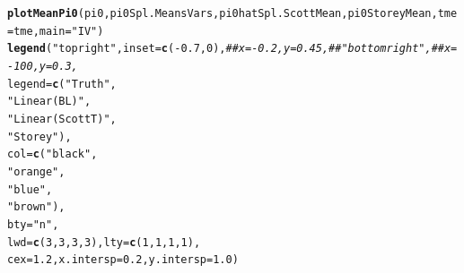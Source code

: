 \documentclass{article}\usepackage[]{graphicx}\usepackage[]{color}
\makeatletter
\newcommand{\hlnum}[1]{\textcolor[rgb]{0.686,0.059,0.569}{#1}}%
\newcommand{\hlstr}[1]{\textcolor[rgb]{0.192,0.494,0.8}{#1}}%
\newcommand{\hlcom}[1]{\textcolor[rgb]{0.678,0.584,0.686}{\textit{#1}}}%
\newcommand{\hlopt}[1]{\textcolor[rgb]{0,0,0}{#1}}%
\newcommand{\hlstd}[1]{\textcolor[rgb]{0.345,0.345,0.345}{#1}}%
\newcommand{\hlkwc}[1]{\textcolor[rgb]{0.333,0.667,0.333}{#1}}%
\newcommand{\hlkwd}[1]{\textcolor[rgb]{0.737,0.353,0.396}{\textbf{#1}}}%
\newenvironment{kframe}{%
 \def\at@end@of@kframe{}%
 \ifinner\ifhmode%
  \def\at@end@of@kframe{\end{minipage}}%
  \begin{minipage}{\columnwidth}%
 \fi\fi%
 \def\FrameCommand##1{\hskip\@totalleftmargin \hskip-\fboxsep
 \colorbox{shadecolor}{##1}\hskip-\fboxsep
     \hskip-\linewidth \hskip-\@totalleftmargin \hskip\columnwidth}%
 \MakeFramed {\advance\hsize-\width
   \@totalleftmargin\z@ \linewidth\hsize
   \@setminipage}}%
 {\par\unskip\endMakeFramed%
 \at@end@of@kframe}
\newenvironment{knitrout}{}{} %
\makeatother
\begin{document}
\begin{knitrout}
\begin{kframe}
\begin{alltt}
\hlkwd{plotMeanPi0}\hlstd{(pi0, pi0Spl.MeansVars, pi0hatSpl.ScottMean, pi0StoreyMean,} \hlkwc{tme}\hlstd{=tme,} \hlkwc{main}\hlstd{=}\hlstr{"IV"}\hlstd{)}
\hlkwd{legend}\hlstd{(}\hlstr{"topright"}\hlstd{,} \hlkwc{inset}\hlstd{=}\hlkwd{c}\hlstd{(}\hlopt{-}\hlnum{0.7}\hlstd{,}\hlnum{0}\hlstd{),}\hlcom{##x=-0.2, y=0.45,##"bottomright", ##x=-100, y=0.3, }
       \hlkwc{legend}\hlstd{=}\hlkwd{c}\hlstd{(}\hlstr{"Truth"}\hlstd{,}
                \hlstr{"Linear (BL)"}\hlstd{,}
                \hlstr{"Linear (Scott T)"}\hlstd{,}
                \hlstr{"Storey"}\hlstd{),}
       \hlkwc{col}\hlstd{=}\hlkwd{c}\hlstd{(}\hlstr{"black"}\hlstd{,}
             \hlstr{"orange"}\hlstd{,}
             \hlstr{"blue"}\hlstd{,}
             \hlstr{"brown"}\hlstd{),}
       \hlkwc{bty}\hlstd{=}\hlstr{"n"}\hlstd{,}
       \hlkwc{lwd}\hlstd{=}\hlkwd{c}\hlstd{(}\hlnum{3}\hlstd{,}\hlnum{3}\hlstd{,}\hlnum{3}\hlstd{,}\hlnum{3}\hlstd{),} \hlkwc{lty}\hlstd{=}\hlkwd{c}\hlstd{(}\hlnum{1}\hlstd{,}\hlnum{1}\hlstd{,}\hlnum{1}\hlstd{,}\hlnum{1}\hlstd{),}
       \hlkwc{cex}\hlstd{=}\hlnum{1.2}\hlstd{,} \hlkwc{x.intersp}\hlstd{=}\hlnum{0.2}\hlstd{,} \hlkwc{y.intersp}\hlstd{=}\hlnum{1.0}\hlstd{)}
\end{alltt}
\end{kframe}


\end{knitrout}
\end{document}
